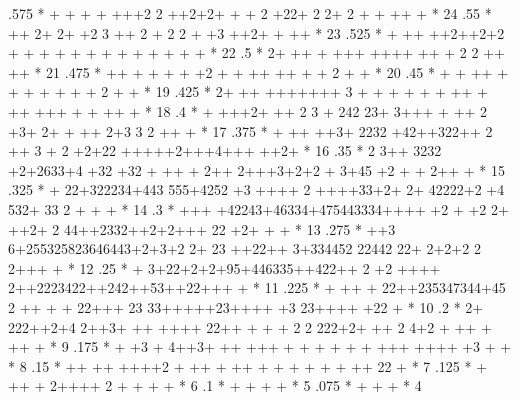 \begin{Listing}
      .575  *              +     +  +  +  +++2 2 ++2+2+             +    +   2 +22+   2 2+ 2    + +    ++ +            *  24
      .55   *                   ++    2+ 2+ +2 3   ++               2  +    2 2 +   +3   ++2+ +        ++              *  23
      .525  *                      +  ++ ++2++2+2   +            +      + +  +  +    +  + + +  +   +        +          *  22
      .5    *                      2+ ++ + +++   ++++ ++        +                2 2  ++                       ++      *  21
      .475  *                    ++     + +   +     + +2  +         +       ++    ++ +    + 2 +             +          *  20
      .45   *                       +  +        ++ +                +    +         + +   + +    2   +        +         *  19
      .425  *                    2+ ++  +++++++ 3 +    + +     +    + +    ++     + ++ +++          + +  ++    +       *  18
      .4    *               +   +++2+ ++ 2 3 + 242 23+ 3+++ +  ++    2  +3+ 2+   +    ++ 2+3  3     2  ++ +            *  17
      .375  *                 + ++ ++3+   2232 +42++322++  2    ++   3 + 2  +2+22    +++++2+++4+++   ++2+              *  16
      .35   *                 2  3++ 3232 +2+2633+4 +32 +32   +  ++   +   2++  2+++3+2+2 + 3+45 +2 + + 2++   +         *  15
      .325  *                 +    22+322234+443 555+4252 +3 ++++ 2 ++++33+2+ 2+ 42222+2 +4 532+  33  2 +    +     +   *  14
      .3    *                 +++ +42243+46334+475443334++++ +2 +    +2 2+ ++2+ 2 44++2332++2+2+++  22   +2+  + +      *  13
      .275  *                   ++3  6+255325823646443+2+3+2   2+   23 ++22++ 3+334452 22442 22+ 2+2+2 2 2+++ +        *  12
      .25   *               +   3+22+2+2+95+446335++422++     2    +2 ++++ 2++2223422++242++53++22+++        +         *  11
      .225  *                +  ++ + 22++235347344+45  2 ++  +     + 22+++ 23 33+++++23++++ +3 23++++ +22  +           *  10
      .2    *                      2+ 222++2+4 2++3+ ++ ++++ 22++ + +  + 2 2 222+2+ ++ 2 4+2   + ++ +  ++ +            *   9
      .175  *                    +   +3 +   4++3+ ++  +++    +     +   +  +    +  +    +++   ++++   +3   + +           *   8
      .15   *                     ++    ++ ++++2    + ++  +          ++  + +     + +   + +    ++ 22  +                 *   7
      .125  *                  +   ++ +  2++++  2   +                           +   +         +                        *   6
      .1    *                                       +  +              +                  +                             *   5
      .075  *                               +  +      +                                                                *   4

\end{Listing}
